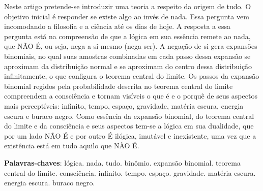 \vspace{-15mm}
\maketitle
\vspace{-5mm}
\begin{resumoumacoluna}
\vspace{-2mm}
	Neste artigo pretende-se introduzir uma teoria a respeito da origem de tudo. O objetivo inicial é responder se existe algo ao invés de nada. Essa pergunta vem incomodando a filosofia e a ciência até os dias de hoje. A resposta a essa pergunta está na compreensão de que a lógica em sua essência remete ao nada, que NÃO É, ou seja, nega a si mesmo (nega ser). A negação de si gera expansões binomiais, no qual suas amostras combinadas em cada passo dessa expansão se aproximam da distribuição normal e se aproximam do centro dessa distribuição infinitamente, o que configura o teorema central do limite. Os passos da expansão binomial regidos pela probabilidade descrita no teorema central do limite compreendem a consciência e tornam visíveis o que é e o porquê de seus aspectos mais perceptíveis: infinito, tempo, espaço, gravidade, matéria escura, energia escura e buraco negro. Como essência da expansão binomial, do teorema central do limite e da consciência e seus aspectos tem-se a lógica em sua dualidade, que por um lado NÃO É e por outro É ilógica, imutável e inexistente, uma vez que a existência está em tudo aquilo que NÃO É. 
 \vspace{\onelineskip} 
 \noindent
 
 \textbf{Palavras-chaves}: lógica. nada. tudo. binômio. expansão binomial. teorema central do limite. consciência. infinito. tempo. espaço. gravidade. matéria escura. energia escura. buraco negro.
\end{resumoumacoluna}


